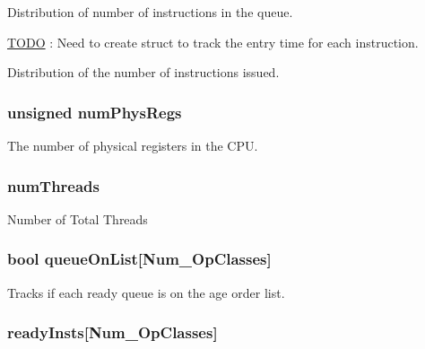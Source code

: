 \label{classInstructionQueue_a90810f5beb7dff46f4b45f96620474b6}
Distribution of number of instructions in the queue. \begin{Desc}
\item[\hyperlink{todo__todo000033}{TODO}]: Need to create struct to track the entry time for each instruction. \end{Desc}
Distribution of the number of instructions issued. \hypertarget{classInstructionQueue_a0d2a78a8e887f06150904000b2beb6cd}{
\subsubsection[{numPhysRegs}]{\setlength{\rightskip}{0pt plus 5cm}unsigned {\bf numPhysRegs}}}
\label{classInstructionQueue_a0d2a78a8e887f06150904000b2beb6cd}
The number of physical registers in the CPU. \hypertarget{classInstructionQueue_a88377f855dbf5adeeecb06b5bb821d35}{
\subsubsection[{numThreads}]{ {\bf numThreads}}}
\label{classInstructionQueue_a88377f855dbf5adeeecb06b5bb821d35}
Number of Total Threads \hypertarget{classInstructionQueue_abd5388bcfcc78ba7299f0178672b4ac2}{
\subsubsection[{queueOnList}]{\setlength{\rightskip}{0pt plus 5cm}bool {\bf queueOnList}\mbox{[}{\bf Num\_\-OpClasses}\mbox{]}}}
\label{classInstructionQueue_abd5388bcfcc78ba7299f0178672b4ac2}
Tracks if each ready queue is on the age order list. \hypertarget{classInstructionQueue_a84f7fc18dadb9ea3ef6ed7dd9f375c46}{
\subsubsection[{readyInsts}]{ {\bf readyInsts}\mbox{[}{\bf Num\_\-OpClasses}\mbox{]}}}
